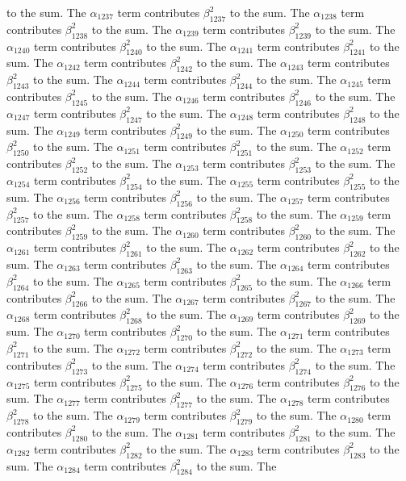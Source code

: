 \begin{lemma}
to the sum. The $\alpha_{1237}$ term contributes $\beta_{1237}^{2}$ to the sum. The $\alpha_{1238}$ term contributes $\beta_{1238}^{2}$ to the sum. The $\alpha_{1239}$ term contributes $\beta_{1239}^{2}$ to the sum. The $\alpha_{1240}$ term contributes $\beta_{1240}^{2}$ to the sum. The $\alpha_{1241}$ term contributes $\beta_{1241}^{2}$ to the sum. The $\alpha_{1242}$ term contributes $\beta_{1242}^{2}$ to the sum. The $\alpha_{1243}$ term contributes $\beta_{1243}^{2}$ to the sum. The $\alpha_{1244}$ term contributes $\beta_{1244}^{2}$ to the sum. The $\alpha_{1245}$ term contributes $\beta_{1245}^{2}$ to the sum. The $\alpha_{1246}$ term contributes $\beta_{1246}^{2}$ to the sum. The $\alpha_{1247}$ term contributes $\beta_{1247}^{2}$ to the sum. The $\alpha_{1248}$ term contributes $\beta_{1248}^{2}$ to the sum. The $\alpha_{1249}$ term contributes $\beta_{1249}^{2}$ to the sum. The $\alpha_{1250}$ term contributes $\beta_{1250}^{2}$ to the sum. The $\alpha_{1251}$ term contributes $\beta_{1251}^{2}$ to the sum. The $\alpha_{1252}$ term contributes $\beta_{1252}^{2}$ to the sum. The $\alpha_{1253}$ term contributes $\beta_{1253}^{2}$ to the sum. The $\alpha_{1254}$ term contributes $\beta_{1254}^{2}$ to the sum. The $\alpha_{1255}$ term contributes $\beta_{1255}^{2}$ to the sum. The $\alpha_{1256}$ term contributes $\beta_{1256}^{2}$ to the sum. The $\alpha_{1257}$ term contributes $\beta_{1257}^{2}$ to the sum. The $\alpha_{1258}$ term contributes $\beta_{1258}^{2}$ to the sum. The $\alpha_{1259}$ term contributes $\beta_{1259}^{2}$ to the sum. The $\alpha_{1260}$ term contributes $\beta_{1260}^{2}$ to the sum. The $\alpha_{1261}$ term contributes $\beta_{1261}^{2}$ to the sum. The $\alpha_{1262}$ term contributes $\beta_{1262}^{2}$ to the sum. The $\alpha_{1263}$ term contributes $\beta_{1263}^{2}$ to the sum. The $\alpha_{1264}$ term contributes $\beta_{1264}^{2}$ to the sum. The $\alpha_{1265}$ term contributes $\beta_{1265}^{2}$ to the sum. The $\alpha_{1266}$ term contributes $\beta_{1266}^{2}$ to the sum. The $\alpha_{1267}$ term contributes $\beta_{1267}^{2}$ to the sum. The $\alpha_{1268}$ term contributes $\beta_{1268}^{2}$ to the sum. The $\alpha_{1269}$ term contributes $\beta_{1269}^{2}$ to the sum. The $\alpha_{1270}$ term contributes $\beta_{1270}^{2}$ to the sum. The $\alpha_{1271}$ term contributes $\beta_{1271}^{2}$ to the sum. The $\alpha_{1272}$ term contributes $\beta_{1272}^{2}$ to the sum. The $\alpha_{1273}$ term contributes $\beta_{1273}^{2}$ to the sum. The $\alpha_{1274}$ term contributes $\beta_{1274}^{2}$ to the sum. The $\alpha_{1275}$ term contributes $\beta_{1275}^{2}$ to the sum. The $\alpha_{1276}$ term contributes $\beta_{1276}^{2}$ to the sum. The $\alpha_{1277}$ term contributes $\beta_{1277}^{2}$ to the sum. The $\alpha_{1278}$ term contributes $\beta_{1278}^{2}$ to the sum. The $\alpha_{1279}$ term contributes $\beta_{1279}^{2}$ to the sum. The $\alpha_{1280}$ term contributes $\beta_{1280}^{2}$ to the sum. The $\alpha_{1281}$ term contributes $\beta_{1281}^{2}$ to the sum. The $\alpha_{1282}$ term contributes $\beta_{1282}^{2}$ to the sum. The $\alpha_{1283}$ term contributes $\beta_{1283}^{2}$ to the sum. The $\alpha_{1284}$ term contributes $\beta_{1284}^{2}$ to the sum. The 
\end{lemma}

